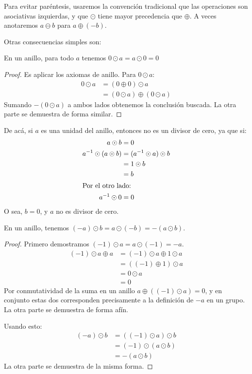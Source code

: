   Para evitar paréntesis,
  usaremos la convención tradicional
  que las operaciones son asociativas izquierdas,
  y que \(\odot\) tiene mayor precedencia que \(\oplus\).
  A veces anotaremos \(a \ominus b\) para \(a \oplus (-b)\).

  Otras consecuencias simples son:
  \begin{theorem}
    \label{theo:ring-0a}
    En un anillo,
    para todo \(a\) tenemos
    \(0 \odot a = a \odot 0 = 0\)
  \end{theorem}
  \begin{proof}
    Es aplicar los axiomas de anillo.
    Para \(0 \odot a\):
    \begin{align*}
      0 \odot a
	&= (0 \oplus 0) \odot a \\
	&= (0 \odot a) \oplus (0 \odot a)
    \end{align*}
    Sumando \(-(0 \odot a)\) a ambos lados obtenemos la conclusión buscada.
    La otra parte se demuestra de forma similar.
  \end{proof}
  De acá,
  si \(a\) es una unidad del anillo,
  entonces no es un divisor de cero,
  ya que si:
  \begin{align*}
    a \odot b
      &= 0 \\
    a^{-1} \odot (a \odot b)
      &= (a^{-1} \odot a) \odot b \\
      &= 1 \odot b \\
      &= b \\
  \intertext{Por el otro lado:}
    a^{-1} \odot 0
      &= 0
  \end{align*}
  O sea,
  \(b = 0\),
  y \(a\) no es divisor de cero.
  \begin{theorem}
    \label{theo:ring-(a*-b)}
    En un anillo,
    tenemos \((-a) \odot b = a \odot (-b) = -(a \odot b)\).
  \end{theorem}
  \begin{proof}
    Primero demostramos \((-1) \odot a = a \odot (-1) = -a\).
    \begin{align*}
      (-1) \odot a \oplus a
	&= (-1) \odot a \oplus 1 \odot a \\
	&= ((-1) \oplus 1) \odot a \\
	&= 0 \odot a \\
	&= 0
    \end{align*}
    Por conmutatividad de la suma en un anillo
    \(a \oplus ((-1) \odot a) = 0\),
    y en conjunto estas dos corresponden precisamente
    a la definición de \(-a\) en un grupo.
    La otra parte se demuestra de forma afín.

    Usando esto:
    \begin{align*}
      (-a) \odot b
	&= ((-1) \odot a) \odot b \\
	&= (-1) \odot (a \odot b) \\
	&= -(a \odot b)
    \end{align*}
    La otra parte se demuestra de la misma forma.
  \end{proof}
